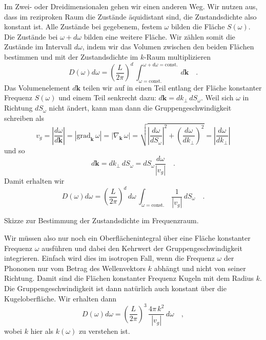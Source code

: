 Im Zwei- oder Dreidimensionalen gehen wir einen anderen Weg. Wir nutzen aus, dass im reziproken Raum die Zustände äquidistant sind, die Zustandsdichte also konstant ist. Alle Zustände bei gegebenem, festem $\omega$ bilden die Fläche $S(\omega)$. Die Zustände bei $\omega + d\omega$ bilden eine weitere Fläche. Wir zählen somit die Zustände im Intervall $d\omega$, indem wir das Volumen zwischen den beiden Flächen bestimmen und mit der Zustandsdichte im $k$-Raum multiplizieren
\begin{equation}
D(\omega) d\omega = \left( \frac{L}{2 \pi} \right)^d \, \int_{\omega = \text{const.}}^{\omega + d\omega = \text{const.}} \, d \mathbf{k} \quad .
\end{equation}
Das Volumenelement $d \mathbf{k}$ teilen wir auf in einen Teil entlang der Fläche konstanter Frequenz $S(\omega)$ und einem Teil senkrecht dazu:  $d \mathbf{k} = dk_\perp \, dS_\omega$. Weil sich $\omega$ in Richtung $ dS_\omega$ nicht ändert,  kann man dann die Gruppengeschwindigkeit schreiben als
\begin{equation}
v_g = \left| \frac{d\omega}{d \mathbf{k}} \right| 
= \left| \text{grad}_\mathbf{k}  \, \omega \right| 
= \left| \nabla_\mathbf{k} \,  \omega \right| 
= \sqrt{ \left| \frac{d\omega}{d S_\omega}\right| ^2 +
\left(\frac{d\omega}{d k_\perp}\right)^2  } 
= \left| \frac{d\omega}{d k_\perp} \right|
\end{equation}
und so
\begin{equation}
d \mathbf{k} = dk_\perp \, dS_\omega = dS_\omega \frac{d \omega}{|v_g|} \quad .
\end{equation}
Damit erhalten wir
\begin{equation}
D(\omega) d\omega = \left( \frac{L}{2 \pi} \right)^d \, d\omega \, \int_{\omega = \text{const.}}\,   \frac{1}{|v_g|} \, dS_\omega \quad . \label{eq:WK_dos_omega}
\end{equation}
\begin{marginfigure}

\caption{Skizze zur Bestimmung der Zustandsdichte im Frequenzraum.}
\end{marginfigure}
Wir müssen also nur noch ein Oberflächenintegral über eine Fläche konstanter Frequenz $\omega$ ausführen und dabei den Kehrwert der Gruppengeschwindigkeit integrieren. Einfach wird dies im isotropen Fall, wenn die Frequenz $\omega$ der Phononen nur vom Betrag des Wellenvektors $k$ abhängt und nicht von seiner Richtung. Damit sind die Flächen konstanter Frequenz Kugeln mit dem Radius $k$.  Die Gruppengeschwindigkeit ist dann natürlich auch konstant über die Kugeloberfläche. Wir erhalten dann
\begin{equation}
D(\omega) d\omega = \left( \frac{L}{2 \pi} \right)^3 \,     \frac{ 4 \pi \, k^2 }{|v_g|}   \, d\omega  \quad ,
\end{equation} 
wobei $k$ hier als $k(\omega)$ zu verstehen ist.

